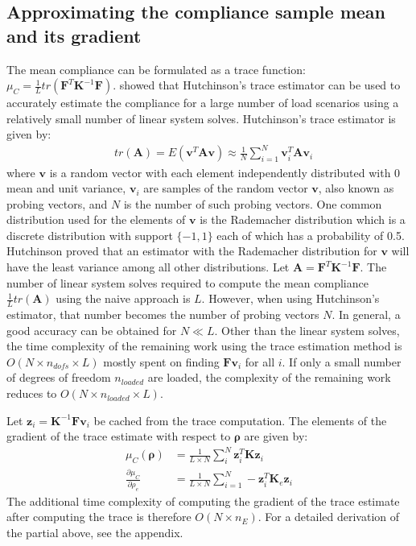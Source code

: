   \subsection{Approximating the compliance sample mean and its gradient} \label{sec:proposed_mean}

    The mean compliance can be formulated as a trace function: $\mu_C = \frac{1}{L} tr(\bm{F}^T \bm{K}^{-1} \bm{F})$. \cite{Zhang2017a} showed that Hutchinson's trace estimator \cite{Hutchinson1990} can be used to accurately estimate the compliance for a large number of load scenarios using a relatively small number of linear system solves. Hutchinson's trace estimator is given by:
      \begin{align}
        & tr(\bm{A}) = E(\bm{v}^T \bm{A} \bm{v}) \approx \frac{1}{N} \sum_{i=1}^{N} \bm{v}_i^T \bm{A} \bm{v}_i
      \end{align}
      where $\bm{v}$ is a random vector with each element independently distributed with 0 mean and unit variance, $\bm{v}_i$ are samples of the random vector $\bm{v}$, also known as probing vectors, and $N$ is the number of such probing vectors. One common distribution used for the elements of $\bm{v}$ is the Rademacher distribution which is a discrete distribution with support $\{-1, 1\}$ each of which has a probability of 0.5. Hutchinson proved that an estimator with the Rademacher distribution for $\bm{v}$ will have the least variance among all other distributions. Let $\bm{A} = \bm{F}^T \bm{K}^{-1} \bm{F}$. The number of linear system solves required to compute the mean compliance $\frac{1}{L} tr(\bm{A})$ using the naive approach is $L$. However, when using Hutchinson's estimator, that number becomes the number of probing vectors $N$. In general, a good accuracy can be obtained for $N \ll L$. Other than the linear system solves, the time complexity of the remaining work using the trace estimation method is $O(N \times n_{dofs} \times L)$ mostly spent on finding $\bm{F} \bm{v}_i$ for all $i$. If only a small number of degrees of freedom $n_{loaded}$ are loaded, the complexity of the remaining work reduces to $O(N \times n_{loaded} \times L)$.

      Let $\bm{z}_i = \bm{K}^{-1} \bm{F} \bm{v}_i$ be cached from the trace computation. The elements of the gradient of the trace estimate with respect to $\bm{\rho}$ are given by:
      \begin{align}
       \mu_C(\bm{\rho}) & = \frac{1}{L \times N} \sum_i^N \bm{z}_i^T \bm{K} \bm{z}_i \\
       \frac{\partial \mu_C}{\partial \rho_e} & = \frac{1}{L \times N} \sum_{i=1}^N -\bm{z}_i^T \bm{K}_e \bm{z}_i
      \end{align}
      The additional time complexity of computing the gradient of the trace estimate after computing the trace is therefore $O(N \times n_E)$. For a detailed derivation of the partial above, see the appendix.

